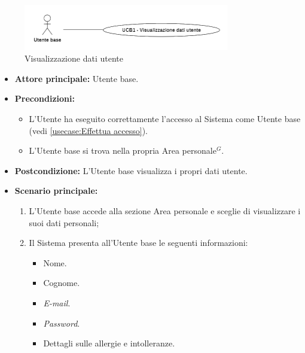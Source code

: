 \label{usecase:Visualizzazione dati utente}

\begin{figure}[h]
	\centering
	\includegraphics[width=0.8\textwidth]{./uml/UCB1.png} 
	\caption{Visualizzazione dati utente}
	\label{fig:UCB1}
  \end{figure}


\begin{itemize}
	\item \textbf{Attore principale:} Utente base.

	\item \textbf{Precondizioni:}
	      \begin{itemize}
		      \item L'Utente ha eseguito correttamente l'accesso al Sistema come
		            Utente base (vedi \autoref{usecase:Effettua accesso}).
		      \item L'Utente base si trova nella propria Area personale$^G$.
	      \end{itemize}

	\item \textbf{Postcondizione:} L'Utente base visualizza i propri dati utente.

	\item \textbf{Scenario principale:}
	      \begin{enumerate}
		      \item L'Utente base accede alla sezione Area personale e sceglie di visualizzare i suoi dati personali;
		      \item Il Sistema presenta all'Utente base le seguenti informazioni:
		            \begin{itemize}
			            \item Nome.
			            \item Cognome.
			            \item \textit{E-mail}.
			            \item \textit{Password}.
			            \item Dettagli sulle allergie e intolleranze.
		            \end{itemize}
	      \end{enumerate}
\end{itemize}
